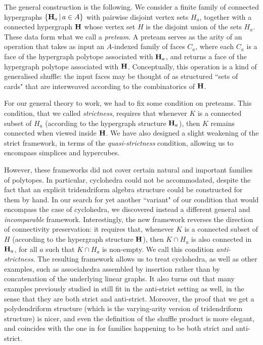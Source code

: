 \documentclass{article}
\theoremstyle{plain}
\theoremstyle{definition}
\newcommand{\hyper}[1]{{\bf #1}}
\begin{document}
 The general construction is the following.  We consider a finite family of connected hypergraphs $\{\hyper{H}_a \,|\, a\in A\}$ with pairwise disjoint vertex sets $H_a$, together with a connected hypergraph $\hyper{H}$ whose vertex set $H$ is the disjoint union of the sets $H_a$. These data form  what we call a {\it preteam}. A preteam 
serves as the arity 
of an operation that   takes as input an $A$-indexed  family of faces $C_a$, where  each $C_a$ is a face of the hypergraph polytope associated with $\hyper{H}_a$,  and returns a face of the hypergraph polytope associated with  $\hyper{H}$.  Conceptually, this operation is   a kind of generalised shuffle:  the input faces may be thought of as   structured ``sets of cards" that are interweaved according to the combinatorics of $\hyper{H}$. 

\smallskip

 For our general theory to work, we had to fix some condition on preteams. This condition, that we called {\it strictness}, requires that whenever $K$ is a connected subset of $H_a$ (according to  the hypergraph structure $\hyper{H}_a$), then $K$ remains  connected when viewed inside $\hyper{H}$.  We have also designed
a slight weakening of the strict framework, in terms of the  {\it quasi-strictness} condition, allowing us to encompass simplices and hypercubes. 

\smallskip


However, these frameworks did not cover certain natural and important families of polytopes. In particular, cyclohedra \cite{Markl-Cyc,Simion} could not be accommodated, despite the fact that an 
explicit tridendriform algebra structure could be constructed for them by hand. In our search for yet another ``variant" of our condition that would encompass the case of cyclohedra,
we discovered instead a different general and {\it{incomparable}} framework. Interestingly, the new framework reverses the direction of connectivity preservation: it requires that, whenever $K$ is a connected subset of $H$ (according to the hypergraph structure $\hyper{H}$), then $K\cap H_a$ is also connected in $\hyper{H}_a$, for all $a$ such that $K\cap H_a$ is non-empty. 
We call this condition {\it{anti-strictness}}. The resulting framework allows us to treat cyclohedra, as well as other examples, such as associahedra assembled by insertion rather than by concatenation of the underlying linear graphs.  It also turns out that many examples previously studied in \cite{PLBJ1} still fit in the anti-strict setting as well, in the sense that they are both strict and anti-strict.  Moreover, the proof that we get a polydendriform structure (which is the varying-arity version of tridendriform structure) is nicer, and even the definition of the shuffle product is more elegant, and coincides with the one in  \cite{PLBJ1} for families happening to be both strict and anti-strict.  
 
\end{document}
